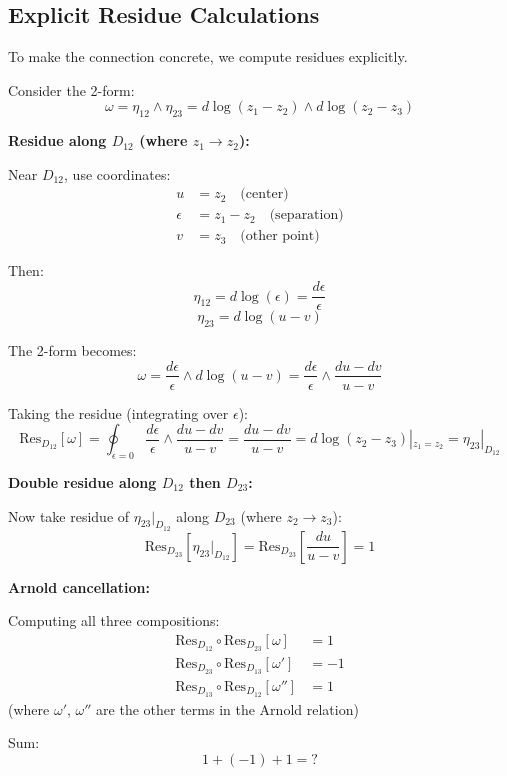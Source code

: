 \subsection{Explicit Residue Calculations}

To make the connection concrete, we compute residues explicitly.

\begin{computation}\label{comp:explicit-residues}
Consider the 2-form:
$$\omega = \eta_{12} \wedge \eta_{23} = d\log(z_1 - z_2) \wedge d\log(z_2 - z_3)$$

\textbf{Residue along $D_{12}$ (where $z_1 \to z_2$):}

Near $D_{12}$, use coordinates:
\begin{align*}
u &= z_2 \quad \text{(center)}\\
\epsilon &= z_1 - z_2 \quad \text{(separation)}\\
v &= z_3 \quad \text{(other point)}
\end{align*}

Then:
$$\eta_{12} = d\log(\epsilon) = \frac{d\epsilon}{\epsilon}$$
$$\eta_{23} = d\log(u - v)$$

The 2-form becomes:
$$\omega = \frac{d\epsilon}{\epsilon} \wedge d\log(u - v) = \frac{d\epsilon}{\epsilon} 
\wedge \frac{du - dv}{u - v}$$

Taking the residue (integrating over $\epsilon$):
$$\text{Res}_{D_{12}}[\omega] = \oint_{\epsilon=0} \frac{d\epsilon}{\epsilon} \wedge 
\frac{du - dv}{u - v} = \frac{du - dv}{u - v} = d\log(z_2 - z_3)|_{z_1 = z_2} = \eta_{23}|_{D_{12}}$$

\textbf{Double residue along $D_{12}$ then $D_{23}$:}

Now take residue of $\eta_{23}|_{D_{12}}$ along $D_{23}$ (where $z_2 \to z_3$):
$$\text{Res}_{D_{23}}[\eta_{23}|_{D_{12}}] = \text{Res}_{D_{23}}\left[\frac{du}{u-v}\right]
= 1$$

\textbf{Arnold cancellation:}

Computing all three compositions:
\begin{align*}
\text{Res}_{D_{12}} \circ \text{Res}_{D_{23}}[\omega] &= 1\\
\text{Res}_{D_{23}} \circ \text{Res}_{D_{13}}[\omega'] &= -1\\
\text{Res}_{D_{13}} \circ \text{Res}_{D_{12}}[\omega''] &= 1
\end{align*}
(where $\omega'$, $\omega''$ are the other terms in the Arnold relation)

Sum:
$$1 + (-1) + 1 = ?$$


\end{computation}
